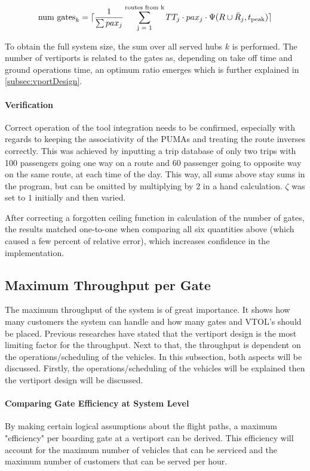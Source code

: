 \begin{align}
    \text{num gates}_k = \lceil \frac{1}{\sum{pax_j}} \sum_{\text{j = 1}}^{\text{routes from k}} {TT_j \cdot pax_j \cdot \Psi(R\cup\bar{R}_j, t_{\text{peak}})} \rceil
\end{align}

To obtain the full system size, the sum over all served hubs $k$ is performed. The number of vertiports is related to the gates as, depending on take off time and ground operations time, an optimum ratio emerges which is further explained in \autoref{subsec:vportDesign}.



\paragraph{Verification}

Correct operation of the tool integration needs to be confirmed, especially with regards to keeping the associativity of the PUMAs and treating the route inverses correctly. This was achieved by inputting a trip database of only two trips with 100 passengers going one way on a route and 60 passenger going to opposite way on the same route, at each time of the day. This way, all sums above stay sums in the program, but can be omitted by multiplying by 2 in a hand calculation. $\zeta$ was set to $1$ initially and then varied.

After correcting a forgotten ceiling function in calculation of the number of gates, the results matched one-to-one when comparing all six quantities above (which caused a few percent of relative error), which increases confidence in the implementation.



\subsection{Maximum Throughput per Gate} \label{subsec:GateThroughput}
The maximum throughput of the system is of great importance. It shows how many customers the system can handle and how many gates and VTOL's should be placed. Previous researches have stated that the vertiport design is the most limiting factor for the throughput. Next to that, the throughput is dependent on the operations/scheduling of the vehicles. In this subsection, both aspects will be discussed. Firstly, the operations/scheduling of the vehicles will be explained then the vertiport design will be discussed.

\paragraph{Comparing Gate Efficiency at System Level}
By making certain logical assumptions about the flight paths, a maximum "efficiency" per boarding gate at a vertiport can be derived. This efficiency will account for the maximum number of vehicles that can be serviced and the maximum number of customers that can be served per hour.

